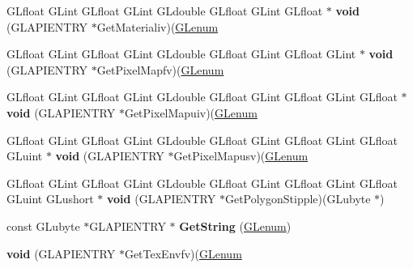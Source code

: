 \begin{DoxyCompactItemize}
\mbox{\label{struct_____g_ldispatch_table_rec_a231e96950c928dc748fc69aae6f2e95f}} 
G\+Lfloat G\+Lint G\+Lfloat G\+Lint G\+Ldouble G\+Lfloat G\+Lint G\+Lfloat $\ast$ {\bfseries void} (G\+L\+A\+P\+I\+E\+N\+T\+RY $\ast$Get\+Materialiv)(\hyperlink{interfacevoid}{G\+Lenum}
\item 
\mbox{\label{struct_____g_ldispatch_table_rec_a3f510929082cf9992d60848aa7a196b2}} 
G\+Lfloat G\+Lint G\+Lfloat G\+Lint G\+Ldouble G\+Lfloat G\+Lint G\+Lfloat G\+Lint $\ast$ {\bfseries void} (G\+L\+A\+P\+I\+E\+N\+T\+RY $\ast$Get\+Pixel\+Mapfv)(\hyperlink{interfacevoid}{G\+Lenum}
\item 
\mbox{\label{struct_____g_ldispatch_table_rec_a2d7d3714a2255f1859c1d5ed047d05a8}} 
G\+Lfloat G\+Lint G\+Lfloat G\+Lint G\+Ldouble G\+Lfloat G\+Lint G\+Lfloat G\+Lint G\+Lfloat $\ast$ {\bfseries void} (G\+L\+A\+P\+I\+E\+N\+T\+RY $\ast$Get\+Pixel\+Mapuiv)(\hyperlink{interfacevoid}{G\+Lenum}
\item 
\mbox{\label{struct_____g_ldispatch_table_rec_a499b7f8e26732f3a4d36fb5f1fb88454}} 
G\+Lfloat G\+Lint G\+Lfloat G\+Lint G\+Ldouble G\+Lfloat G\+Lint G\+Lfloat G\+Lint G\+Lfloat G\+Luint $\ast$ {\bfseries void} (G\+L\+A\+P\+I\+E\+N\+T\+RY $\ast$Get\+Pixel\+Mapusv)(\hyperlink{interfacevoid}{G\+Lenum}
\item 
\mbox{\label{struct_____g_ldispatch_table_rec_af6d9c838724bcd0e114878a73e5568f7}} 
G\+Lfloat G\+Lint G\+Lfloat G\+Lint G\+Ldouble G\+Lfloat G\+Lint G\+Lfloat G\+Lint G\+Lfloat G\+Luint G\+Lushort $\ast$ {\bfseries void} (G\+L\+A\+P\+I\+E\+N\+T\+RY $\ast$Get\+Polygon\+Stipple)(G\+Lubyte $\ast$)
\item 
\mbox{\label{struct_____g_ldispatch_table_rec_adc6148dcfbc695a1587f499991754e80}} 
const G\+Lubyte $\ast$G\+L\+A\+P\+I\+E\+N\+T\+RY $\ast$ {\bfseries Get\+String} (\hyperlink{interfacevoid}{G\+Lenum})
\item 
\mbox{\label{struct_____g_ldispatch_table_rec_ab37d95d15bd744b95fed3602693196e1}} 
{\bfseries void} (G\+L\+A\+P\+I\+E\+N\+T\+RY $\ast$Get\+Tex\+Envfv)(\hyperlink{interfacevoid}{G\+Lenum}

\end{DoxyCompactItemize}
